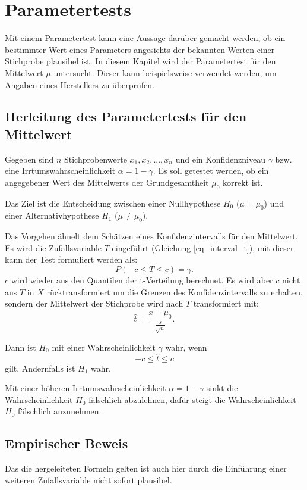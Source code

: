 \documentclass[10pt,twocolumn]{scrartcl}
\begin{document}
\section{Parametertests}
		Mit einem Parametertest kann eine Aussage darüber gemacht werden, ob ein bestimmter Wert eines Parameters angesichts der bekannten Werten einer Stichprobe plausibel ist. In diesem Kapitel wird der Parametertest für den Mittelwert $\mu$ untersucht. Dieser kann beispielsweise verwendet werden, um Angaben eines Herstellers zu überprüfen.
	\subsection{Herleitung des Parametertests für den Mittelwert}
		Gegeben sind $n$ Stichprobenwerte $x_1, x_2, ..., x_n$ und ein Konfidenzniveau $\gamma$ bzw. eine Irrtumswahrscheinlichkeit $\alpha = 1 - \gamma$. Es soll getestet werden, ob ein angegebener Wert des Mittelwerts der Grundgesamtheit $\mu_0$ korrekt ist.

		Das Ziel ist die Entscheidung zwischen einer Nullhypothese $H_0$ ($\mu = \mu_0$) und einer Alternativhypothese $H_1$ ($\mu \ne \mu_0$).

		Das Vorgehen ähnelt dem Schätzen eines Konfidenzintervalls für den Mittelwert. Es wird die Zufallsvariable $T$ eingeführt (Gleichung \ref{eq_interval_t}), mit dieser kann der Test formuliert werden als:
		\begin{equation}
		P(-c \le T \le c) = \gamma .
		\end{equation}
		$c$ wird wieder aus den Quantilen der t-Verteilung berechnet. Es wird aber $c$ nicht aus $T$ in $X$ rücktransformiert um die Grenzen des Konfidenzintervalls zu erhalten, sondern der Mittelwert der Stichprobe wird nach $T$ transformiert mit:
		\begin{equation}
		\hat{t} = \frac{\overline{x} - \mu_0}{\frac{s}{\sqrt{n}}} .
		\end{equation}

		Dann ist $H_0$ mit einer Wahrscheinlichkeit $\gamma$ wahr, wenn
		\begin{equation}
		-c \le \hat{t} \le c
		\end{equation}
		gilt. Andernfalls ist $H_1$ wahr.

		Mit einer höheren Irrtumswahrscheinlichkeit $\alpha = 1 - \gamma$ sinkt die Wahrscheinlichkeit $H_0$ fälschlich abzulehnen, dafür steigt die Wahrscheinlichkeit $H_0$ fälschlich anzunehmen.
	\subsection{Empirischer Beweis}
		Das die hergeleiteten Formeln gelten ist auch hier durch die Einführung einer weiteren Zufallsvariable nicht sofort plausibel.
\end{document}
